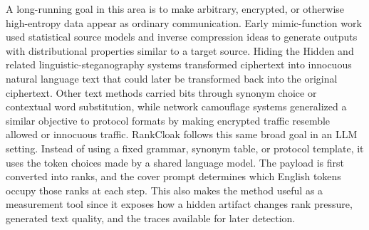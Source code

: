 \documentclass[fleqn,10pt]{wlscirep}
\begin{document}
A long-running goal in this area is to make arbitrary, encrypted, or otherwise high-entropy data appear as ordinary communication. Early mimic-function work used statistical source models and inverse compression ideas to generate outputs with distributional properties similar to a target source\cite{Wayner1992MimicFunctions,Wayner1995StrongTheoreticalSteganography}. Hiding the Hidden and related linguistic-steganography systems transformed ciphertext into innocuous natural language text that could later be transformed back into the original ciphertext\cite{ChapmanDavida1997HidingHidden,Bennett2004LinguisticSteganography}. Other text methods carried bits through synonym choice or contextual word substitution\cite{ChangClark2014PracticalLinguisticSteganography}, while network camouflage systems generalized a similar objective to protocol formats by making encrypted traffic resemble allowed or innocuous traffic\cite{Weinberg2012StegoTorus,Dyer2013FormatTransformingEncryption}. RankCloak follows this same broad goal in an LLM setting. Instead of using a fixed grammar, synonym table, or protocol template, it uses the token choices made by a shared language model. The payload is first converted into ranks, and the cover prompt determines which English tokens occupy those ranks at each step. This also makes the method useful as a measurement tool since it exposes how a hidden artifact changes rank pressure, generated text quality, and the traces available for later detection.
\end{document}
